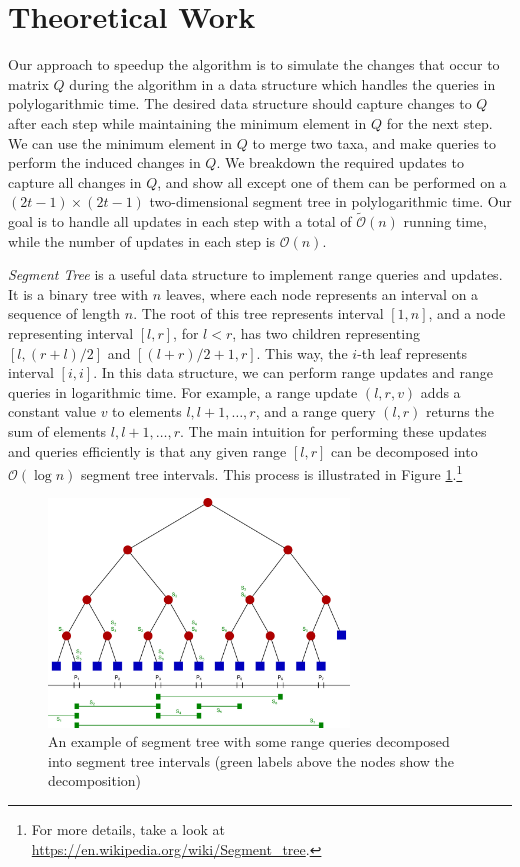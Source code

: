 \section{Theoretical Work}

Our approach to speedup the algorithm is to simulate the changes that occur to matrix $Q$ during the algorithm in a data structure which handles the queries in polylogarithmic time. The desired data structure should capture changes to $Q$ after each step while maintaining the minimum element in $Q$ for the next step. We can use the minimum element in $Q$ to merge two taxa, and make queries to perform the induced changes in $Q$. We breakdown the required updates to capture all changes in $Q$, and show all except one of them can be performed on a $(2t-1) \times (2t-1)$ two-dimensional segment tree in polylogarithmic time. Our goal is to handle all updates in each step with a total of $\widetilde{\mathcal{O}}(n)$ running time, while the number of updates in each step is $\mathcal{O}(n)$.

\emph{Segment Tree} is a useful data structure to implement range queries and updates. It is a binary tree with $n$ leaves, where each node represents an interval on a sequence of length $n$. The root of this tree represents interval $[1, n]$, and a node representing interval $[l, r]$, for $l < r$, has two children representing $[l, (r + l) / 2]$ and $[(l + r) / 2 + 1, r]$. This way, the $i$-th leaf represents interval $[i, i]$. In this data structure, we can perform range updates and range queries in logarithmic time. For example, a range update $(l, r, v)$ adds a constant value $v$ to elements $l, l+1, \ldots, r$, and a range query $(l, r)$ returns the sum of elements $l, l+1, \ldots, r$. The main intuition for performing these updates and queries efficiently is that any given range $[l, r]$ can be decomposed into $\mathcal{O}(\log{n})$ segment tree intervals. This process is illustrated in Figure \ref{segment-tree}.\footnote{For more details, take a look at \href{https://en.wikipedia.org/wiki/Segment_tree}{https://en.wikipedia.org/wiki/Segment\_tree}.}

\begin{figure}[h!]\label{segment-tree}
	\caption{An example of segment tree with some range queries decomposed into segment tree intervals (green labels above the nodes show the decomposition)}
	\begin{center}
		\includegraphics[width=8cm]{Segment_tree.png}
	\end{center}
\end{figure}

